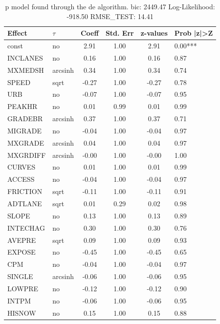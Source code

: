 \begin{table}
	\caption{p model found through the de algorithm. bic: 2449.47 Log-Likelihood: -918.50 RMSE_TEST: 14.41}
	\begin{center}
		\begin{tabular}{|l|l|c|c|c|l|}
			\hline
			Effect & $\tau$ & Coeff & Std. Err & z-values & Prob |z|>Z \\
			\hline
			const & no & 2.91 & 1.00 & 2.91 & 0.00*** \\
			\hline
			INCLANES & no & 0.16 & 1.00 & 0.16 & 0.87 \\
			\hline
			MXMEDSH & arcsinh & 0.34 & 1.00 & 0.34 & 0.74 \\
			\hline
			SPEED & sqrt & -0.27 & 1.00 & -0.27 & 0.78 \\
			\hline
			URB & no & -0.07 & 1.00 & -0.07 & 0.95 \\
			\hline
			PEAKHR & no & 0.01 & 0.99 & 0.01 & 0.99 \\
			\hline
			GRADEBR & arcsinh & 0.37 & 1.00 & 0.37 & 0.71 \\
			\hline
			MIGRADE & no & -0.04 & 1.00 & -0.04 & 0.97 \\
			\hline
			MXGRADE & arcsinh & 0.04 & 1.00 & 0.04 & 0.97 \\
			\hline
			MXGRDIFF & arcsinh & -0.00 & 1.00 & -0.00 & 1.00 \\
			\hline
			CURVES & no & 0.01 & 1.00 & 0.01 & 0.99 \\
			\hline
			ACCESS & no & -0.04 & 1.00 & -0.04 & 0.97 \\
			\hline
			FRICTION & sqrt & -0.11 & 1.00 & -0.11 & 0.91 \\
			\hline
			ADTLANE & sqrt & 0.01 & 0.29 & 0.02 & 0.98 \\
			\hline
			SLOPE & no & 0.13 & 1.00 & 0.13 & 0.89 \\
			\hline
			INTECHAG & no & 0.30 & 1.00 & 0.30 & 0.76 \\
			\hline
			AVEPRE & sqrt & 0.09 & 1.00 & 0.09 & 0.93 \\
			\hline
			EXPOSE & no & -0.45 & 1.00 & -0.45 & 0.65 \\
			\hline
			CPM & no & -0.04 & 1.00 & -0.04 & 0.97 \\
			\hline
			SINGLE & arcsinh & -0.06 & 1.00 & -0.06 & 0.95 \\
			\hline
			LOWPRE & no & -0.12 & 1.00 & -0.12 & 0.90 \\
			\hline
			INTPM & no & -0.06 & 1.00 & -0.06 & 0.95 \\
			\hline
			HISNOW & no & 0.15 & 1.00 & 0.15 & 0.88 \\

\end{tabular}
\end{center}
\end{table}
